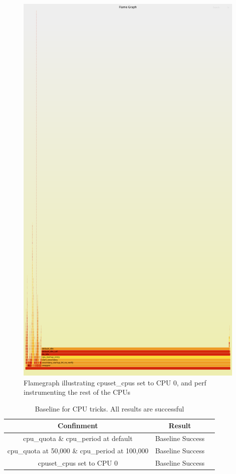 \documentclass{report}  %
\begin{document}
\begin{figure}[H]
    \centering
    \includegraphics[scale=0.2]{cpu_tricks/6.5.5/V1/flamegraph_20241017_112413.png}
    \caption{Flamegraph illustrating cpuset\_cpus set to CPU 0, and perf instrumenting the rest of the CPUs}
    \label{fig:flamegraph}
\end{figure}


\begin{table}[h!]
\centering
\begin{tabular}{|c|c|c|}
\hline
Confinment & Result \\ \hline
cpu\_quota \& cpu\_period at default & Baseline Success \\ \hline
cpu\_quota at 50,000 \& cpu\_period at 100,000 & Baseline Success \\ \hline
cpuset\_cpus set to CPU 0 & Baseline Success \\ \hline
\end{tabular}
\caption{Baseline for CPU tricks. All results are successful}
\end{table}
\end{document}
